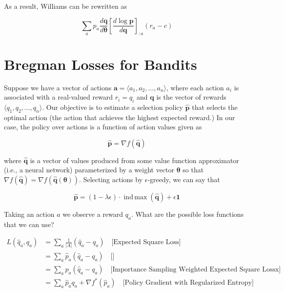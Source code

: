 \documentclass[10pt]{article}
\newcommand{\indmax}{\operatorname{ind\,max}}
\theoremstyle{definition}
\begin{document}
\noindent
As a result, Williams can be rewritten as

$$
\sum_a p_a \frac{d\mathbf{q}}{d\pmb{\theta}}\left[\frac{d\log\mathbf{p}}{d\mathbf{q}}\right]_{:a}(r_a - c)
$$

\section*{Bregman Losses for Bandits}

Suppose we have a vector of actions $\mathbf{a} = \langle a_1, a_2, \hdots, a_n\rangle$, where each action $a_i$ is associated with a real-valued reward $r_i = q_i$ and $\mathbf{q}$ is the vector of rewards $\langle q_1, q_2, \hdots, q_n\rangle$. Our objective is to estimate a selection policy $\mathbf{\hat{p}}$ that selects the optimal action (the action that achieves the highest expected reward.) In our case, the policy over actions is a function of action values given as

$$
\mathbf{\hat{p}} = \nabla f(\mathbf{\hat{q}})
$$

\noindent
where $\mathbf{\hat{q}}$ is a vector of values produced from some value function approximator (i.e., a neural network) parameterized by a weight vector $\pmb{\theta}$ so that $\nabla f(\mathbf{\hat{q}}) = \nabla f(\mathbf{\hat{q}(\pmb{\theta})})$. Selecting actions by $\epsilon$-greedy, we can say that

$$
\mathbf{\hat{p}} = (1 - \lambda\epsilon)\cdot\indmax (\mathbf{\hat{q}}) + \epsilon\mathbf{1}
$$

\noindent
Taking an action $a$ we observe a reward $q_a$. What are the possible loss functions that we can use?

\begin{equation*}
\begin{aligned}
L(\hat{q}_a,q_a) & = \sum_a\frac{1}{\lvert A \rvert}(\hat{q}_a - q_a) \quad \text{[Expected Square Loss]} \\
& = \sum_a\hat{p}_a(\hat{q}_a - q_a) \quad \text{[]} \\
& = \sum_a p_a(\hat{q}_a - q_a) \quad \text{[Importance Sampling Weighted Expected Square Lossx]} \\
& = \sum_a \hat{p}_a q_a + \nabla f^*(\hat{p}_a) \quad \text{[Policy Gradient with Regularized Entropy]}
\end{aligned}
\end{equation*}
\end{document}
